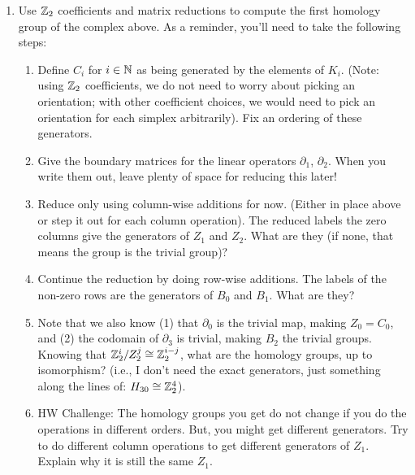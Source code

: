\documentclass{article}
\begin{document}
\begin{enumerate}
    \item Use ${\mathbb Z}_2$ coefficients and matrix reductions to compute the first
        homology group of the complex above.
        As a reminder, you'll need to
        take the following steps:
        \begin{enumerate}[itemsep=2in]
            \item Define $C_i$ for $i \in {\mathbb N}$ as being generated by the elements
                of $K_i$. (Note: using
                ${\mathbb Z}_2$ coefficients, we do not need to worry about picking an
                orientation; with other coefficient choices, we would need to
                pick an orientation for each simplex arbitrarily).  Fix an
                ordering of these generators.

            \pagebreak
            \item Give the boundary matrices for the linear operators
                $\partial_1$, $\partial_2$.  When you write them out, leave
                plenty of space for reducing this later!
                \vspace{4in}
            \item Reduce only using column-wise additions for now. (Either in
                place above or step it out for each column operation).
                The reduced labels the zero columns give the generators of
                $Z_1$ and $Z_2$.  What are they (if none, that means the group
                is the trivial group)?

            \pagebreak
            \item Continue the reduction by doing row-wise additions.  The
                labels of the non-zero rows are the generators of $B_0$ and
                $B_1$.  What are they?

            \item Note that we also know (1) that $\partial_0$ is the trivial
                map, making $Z_0=C_0$, and (2) the codomain of $\partial_3$ is
                trivial, making $B_2$ the trivial groups.
                Knowing that ${\mathbb Z}_2^i / Z_2^j \cong {\mathbb Z}_2^{i-j}$, what are the
                homology groups, up to isomorphism? (i.e., I don't need the exact
                generators, just something along the lines of: $H_{30} \cong
                {\mathbb Z}_2^4$).

            \item HW Challenge: The homology groups you get do not change if you do the
                operations in different orders.  But, you might get different
                generators.  Try to do different column operations to get
                different generators of $Z_1$. Explain why it is still the same
                $Z_1$.
                \vspace{2in}
        \end{enumerate}
\end{enumerate}
\end{document}
